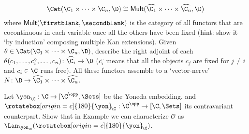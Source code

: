 \begin{exerciseset}
\begin{exercisepoints}
\[
\Cat(\C_1 \times \dots \times \C_n , \D) \cong 
\textsf{Mult}(\widehat{\C_1}\times \dots \times \widehat{\C_n}, \D)
\]
where $\textsf{Mult}(\firstblank,\secondblank)$ is the category of all functors that are cocontinuous in each variable once all the others have been fixed (hint: show it `by induction' composing multiple Kan extensions). Given $\theta \in \Cat(\C_1 \times \dots \times \C_n , \D)$, describe the right adjoint of each $\theta(c_1,\dots,c_i^\circ,\dots, c_n)\colon \widehat{\C_i} \to \D$ ($c_i^\circ$ means that all the objects $c_j$ are fixed for $j\neq i$ and $c_i\in\C$ runs free). All these functors assemble to a `vector-nerve' $N\colon \D \to \widehat{\C_1}\times \dots \times \widehat{\C_n}$.
\item Let $\yon_\C : \C \to [\C^\opp,\Sets]$ be the Yoneda embedding, and $\rotatebox[origin=c]{180}{\yon}_{\!\C} : \C^\opp\to [\C,\Sets]$ its contravariant counterpart. Show that in Example  we can characterize $\mathcal{O}$ as $\Lan_{\yon_\C}(\rotatebox[origin=c]{180}{\yon}_{\!\C})$.
\end{exercisepoints}
\end{exerciseset}
